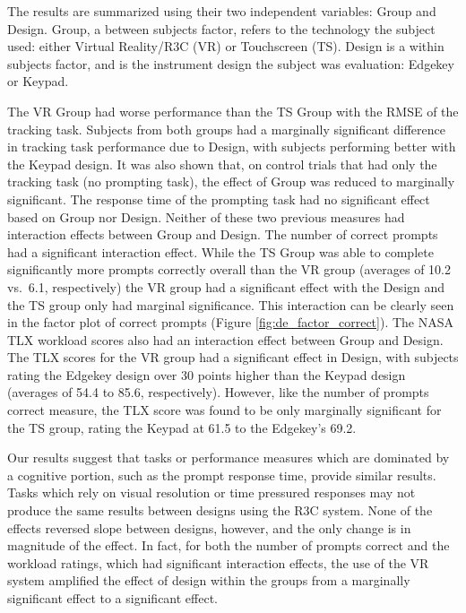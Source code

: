 The results are summarized using their two independent variables: Group and Design.
Group, a between subjects factor, refers to the technology the subject used: either Virtual Reality/R3C (VR) or Touchscreen (TS).
Design is a within subjects factor, and is the instrument design the subject was evaluation: Edgekey or Keypad.

The VR Group had worse performance than the TS Group with the RMSE of the tracking task.
Subjects from both groups had a marginally significant difference in tracking task performance due to Design, with subjects performing better with the Keypad design.
It was also shown that, on control trials that had only the tracking task (no prompting task), the effect of Group was reduced to marginally significant.
The response time of the prompting task had no significant effect based on Group nor Design.
Neither of these two previous measures had interaction effects between Group and Design.
The number of correct prompts had a significant interaction effect.
While the TS Group was able to complete significantly more prompts correctly overall than the VR group (averages of 10.2 vs.\ 6.1, respectively) the VR group had a significant effect with the Design and the TS group only had marginal significance.
This interaction can be clearly seen in the factor plot of correct prompts (Figure \ref{fig:de_factor_correct}).
The NASA TLX workload scores also had an interaction effect between Group and Design.
The TLX scores for the VR group had a significant effect in Design, with subjects rating the Edgekey design over 30 points higher than the Keypad design (averages of 54.4 to 85.6, respectively).
However, like the number of prompts correct measure, the TLX score was found to be only marginally significant for the TS group, rating the Keypad at 61.5 to the Edgekey's 69.2.


Our results suggest that tasks or performance measures which are dominated by a cognitive portion, such as the prompt response time, provide similar results.
Tasks which rely on visual resolution or time pressured responses may not produce the same results between designs using the R3C system.
None of the effects reversed slope between designs, however, and the only change is in magnitude of the effect.
In fact, for both the number of prompts correct and the workload ratings, which had significant interaction effects, the use of the VR system amplified the effect of design within the groups from a marginally significant effect to a significant effect.

